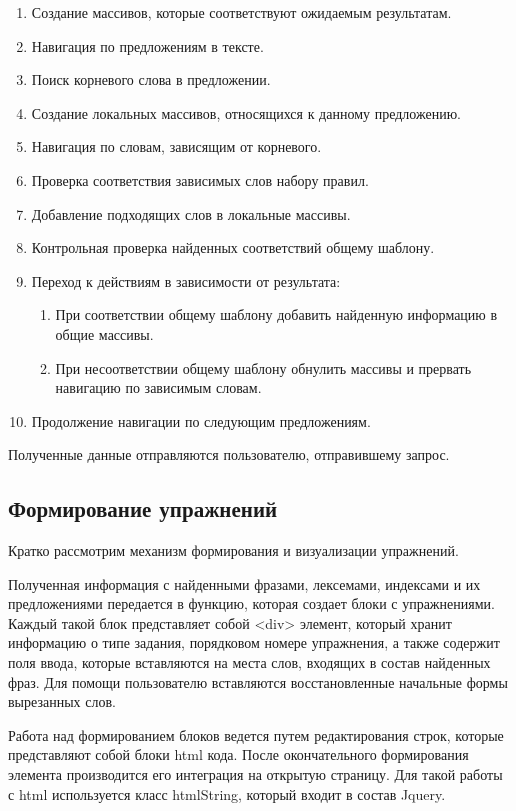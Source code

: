 \begin{enumerate}
  \item Создание массивов, которые соответствуют ожидаемым результатам.
  \item Навигация по предложениям в тексте.
  \item Поиск корневого слова в предложении.
  \item Создание локальных массивов, относящихся к данному предложению.
  \item Навигация по словам, зависящим от корневого.
  \item Проверка соответствия зависимых слов набору правил.
  \item Добавление подходящих слов в локальные массивы.
  \item Контрольная проверка найденных соответствий общему шаблону.
  \item Переход к действиям в зависимости от результата:
  \begin{enumerate}[label*=\arabic*.]
      \item При соответствии общему шаблону добавить найденную информацию в общие массивы.
      \item При несоответствии общему шаблону обнулить массивы и прервать навигацию по зависимым словам.
    \end{enumerate}
 \item Продолжение навигации по следующим предложениям.
\end{enumerate}

Полученные данные отправляются пользователю, отправившему запрос.

\subsection{Формирование упражнений}
Кратко рассмотрим механизм формирования и визуализации упражнений.

Полученная информация с найденными фразами, лексемами, индексами и их предложениями передается в функцию, которая создает блоки с упражнениями. Каждый такой блок представляет собой <div> элемент, который хранит информацию о типе задания, порядковом номере упражнения, а также содержит поля ввода, которые вставляются на места слов, входящих в состав найденных фраз. Для помощи пользователю вставляются восстановленные начальные формы вырезанных слов.

Работа над формированием блоков ведется путем редактирования строк, которые представляют собой блоки html кода. После окончательного формирования элемента производится его интеграция на открытую страницу. Для такой работы с html используется класс htmlString, который входит в состав Jquery.

